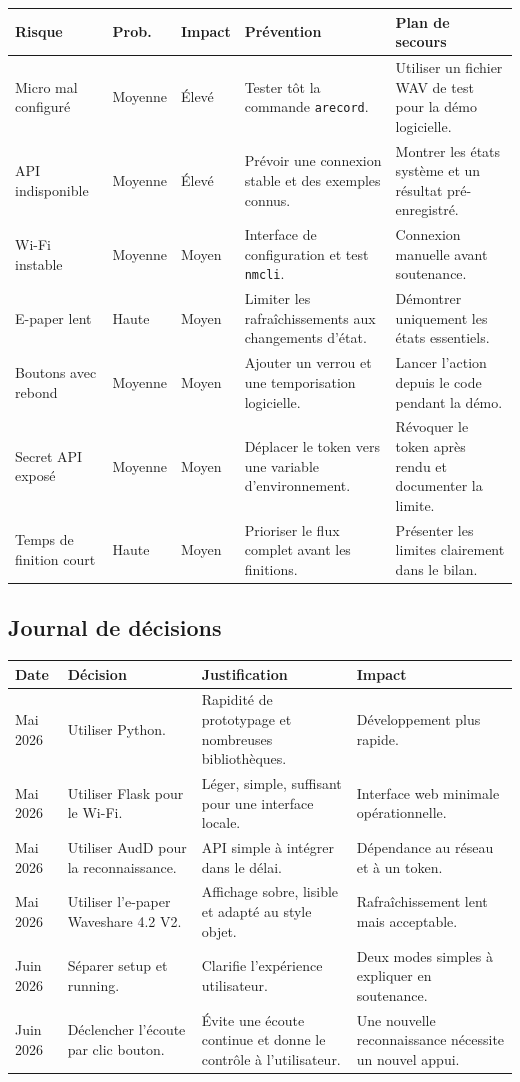 \begin{longtable}{|p{3.2cm}|p{2cm}|p{2cm}|p{3.2cm}|p{3cm}|}
\hline
\textbf{Risque} & \textbf{Prob.} & \textbf{Impact} & \textbf{Prévention} & \textbf{Plan de secours} \\
\hline
Micro mal configuré & Moyenne & Élevé & Tester tôt la commande \texttt{arecord}. & Utiliser un fichier WAV de test pour la démo logicielle. \\
\hline
API indisponible & Moyenne & Élevé & Prévoir une connexion stable et des exemples connus. & Montrer les états système et un résultat pré-enregistré. \\
\hline
Wi-Fi instable & Moyenne & Moyen & Interface de configuration et test \texttt{nmcli}. & Connexion manuelle avant soutenance. \\
\hline
E-paper lent & Haute & Moyen & Limiter les rafraîchissements aux changements d'état. & Démontrer uniquement les états essentiels. \\
\hline
Boutons avec rebond & Moyenne & Moyen & Ajouter un verrou et une temporisation logicielle. & Lancer l'action depuis le code pendant la démo. \\
\hline
Secret API exposé & Moyenne & Moyen & Déplacer le token vers une variable d'environnement. & Révoquer le token après rendu et documenter la limite. \\
\hline
Temps de finition court & Haute & Moyen & Prioriser le flux complet avant les finitions. & Présenter les limites clairement dans le bilan. \\
\hline
\end{longtable}

\subsection{Journal de décisions}

\begin{longtable}{|p{2.5cm}|p{4cm}|p{4cm}|p{3cm}|}
\hline
\textbf{Date} & \textbf{Décision} & \textbf{Justification} & \textbf{Impact} \\
\hline
Mai 2026 & Utiliser Python. & Rapidité de prototypage et nombreuses bibliothèques. & Développement plus rapide. \\
\hline
Mai 2026 & Utiliser Flask pour le Wi-Fi. & Léger, simple, suffisant pour une interface locale. & Interface web minimale opérationnelle. \\
\hline
Mai 2026 & Utiliser AudD pour la reconnaissance. & API simple à intégrer dans le délai. & Dépendance au réseau et à un token. \\
\hline
Mai 2026 & Utiliser l'e-paper Waveshare 4.2 V2. & Affichage sobre, lisible et adapté au style objet. & Rafraîchissement lent mais acceptable. \\
\hline
Juin 2026 & Séparer setup et running. & Clarifie l'expérience utilisateur. & Deux modes simples à expliquer en soutenance. \\
\hline
Juin 2026 & Déclencher l'écoute par clic bouton. & Évite une écoute continue et donne le contrôle à l'utilisateur. & Une nouvelle reconnaissance nécessite un nouvel appui. \\
\hline
\end{longtable}
